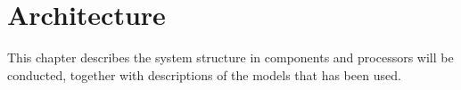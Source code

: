 \chapter{Architecture} \label{Architecture}
This chapter describes the system structure in components and processors will be conducted, together with descriptions of the models that has been used.


